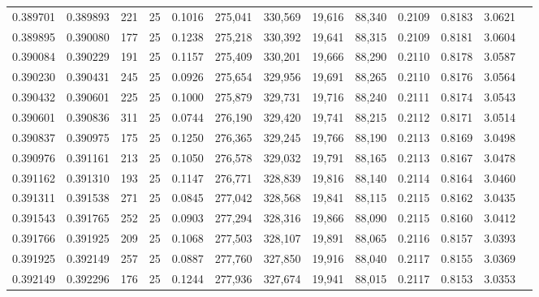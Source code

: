 \begin{tabular}{rrrrrrrrrrrrr}
0.389701 & 0.389893 &   221 &  25 &                                     0.1016 & 275,041 & 330,569 &  19,616 &  88,340 & 0.2109 & 0.8183 & 3.0621 \\
0.389895 & 0.390080 &   177 &  25 &                                     0.1238 & 275,218 & 330,392 &  19,641 &  88,315 & 0.2109 & 0.8181 & 3.0604 \\
0.390084 & 0.390229 &   191 &  25 &                                     0.1157 & 275,409 & 330,201 &  19,666 &  88,290 & 0.2110 & 0.8178 & 3.0587 \\
0.390230 & 0.390431 &   245 &  25 &                                     0.0926 & 275,654 & 329,956 &  19,691 &  88,265 & 0.2110 & 0.8176 & 3.0564 \\
0.390432 & 0.390601 &   225 &  25 &                                     0.1000 & 275,879 & 329,731 &  19,716 &  88,240 & 0.2111 & 0.8174 & 3.0543 \\
0.390601 & 0.390836 &   311 &  25 &                                     0.0744 & 276,190 & 329,420 &  19,741 &  88,215 & 0.2112 & 0.8171 & 3.0514 \\
0.390837 & 0.390975 &   175 &  25 &                                     0.1250 & 276,365 & 329,245 &  19,766 &  88,190 & 0.2113 & 0.8169 & 3.0498 \\
0.390976 & 0.391161 &   213 &  25 &                                     0.1050 & 276,578 & 329,032 &  19,791 &  88,165 & 0.2113 & 0.8167 & 3.0478 \\
0.391162 & 0.391310 &   193 &  25 &                                     0.1147 & 276,771 & 328,839 &  19,816 &  88,140 & 0.2114 & 0.8164 & 3.0460 \\
0.391311 & 0.391538 &   271 &  25 &                                     0.0845 & 277,042 & 328,568 &  19,841 &  88,115 & 0.2115 & 0.8162 & 3.0435 \\
0.391543 & 0.391765 &   252 &  25 &                                     0.0903 & 277,294 & 328,316 &  19,866 &  88,090 & 0.2115 & 0.8160 & 3.0412 \\
0.391766 & 0.391925 &   209 &  25 &                                     0.1068 & 277,503 & 328,107 &  19,891 &  88,065 & 0.2116 & 0.8157 & 3.0393 \\
0.391925 & 0.392149 &   257 &  25 &                                     0.0887 & 277,760 & 327,850 &  19,916 &  88,040 & 0.2117 & 0.8155 & 3.0369 \\
0.392149 & 0.392296 &   176 &  25 &                                     0.1244 & 277,936 & 327,674 &  19,941 &  88,015 & 0.2117 & 0.8153 & 3.0353 \\

\end{tabular}
